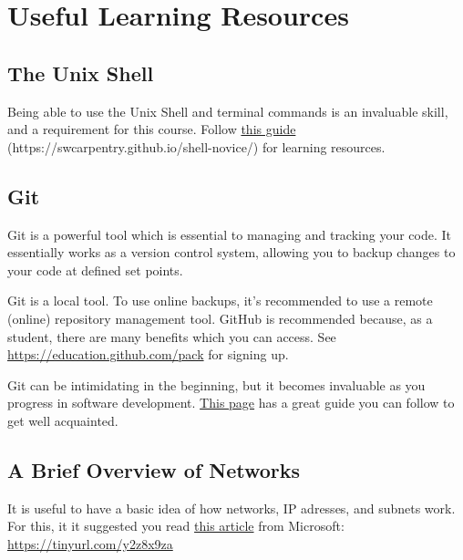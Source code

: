 \section{Useful Learning Resources}
\subsection{The Unix Shell}
Being able to use the Unix Shell and terminal commands is an invaluable skill, and a requirement for this course. Follow \href{https://swcarpentry.github.io/shell-novice/}{this guide} (https://swcarpentry.github.io/shell-novice/) for learning resources.

\subsection{Git}
Git is a powerful tool which is essential to managing and tracking your code. It essentially works as a version control system, allowing you to backup changes to your code at defined set points.

Git is a local tool. To use online backups, it's recommended to use a remote (online) repository management tool. GitHub is recommended because, as a student, there are many benefits which you can access. See \href{https://education.github.com/pack}{https://education.github.com/pack} for signing up.

Git can be intimidating in the beginning, but it becomes invaluable as you progress in software development. \href{https://swcarpentry.github.io/git-novice/}{This page} has a great guide you can follow to get well acquainted.

\subsection{A Brief Overview of Networks}
\label{app:UnderstandingNetworks}
It is useful to have a basic idea of how networks, IP adresses, and subnets work. For this, it it suggested you read \href{https://support.microsoft.com/en-za/help/164015/understanding-tcp-ip-addressing-and-subnetting-basics}{this article} from Microsoft: \href{https://tinyurl.com/y2z8x9za}{https://tinyurl.com/y2z8x9za}